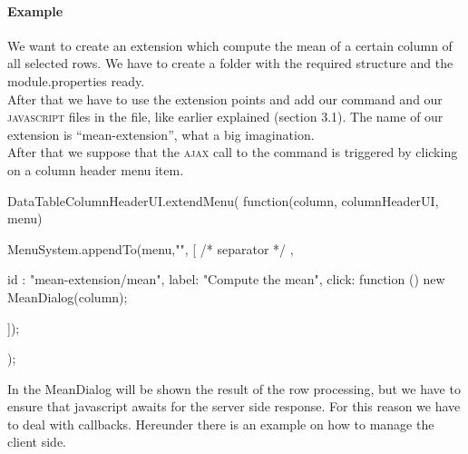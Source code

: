 \paragraph{Example}  We want to create an extension which compute the mean of a certain column of all selected rows. We have to create a folder with the required structure and the module.properties ready. \\
After that we have to use the extension points and add our command and our \textsc{javascript} files in the  file, like earlier explained (section 3.1). The name of our extension is ``mean-extension'', what a big imagination. \\
After that we suppose that the \textsc{ajax} call to the command is triggered by clicking on a column header menu item.
\begin{code}
DataTableColumnHeaderUI.extendMenu(
   function(column, columnHeaderUI, menu){	
      MenuSystem.appendTo(menu,"", 
      [ { /* separator */ }, {
         id : "mean-extension/mean",
         label: "Compute the mean",
         click:  function () { 
             new MeanDialog(column); 
         }

      } ]);
});
\end{code}
In the MeanDialog will be shown the result of the row processing, but we have to ensure that javascript awaits for the server side response. For this reason we have to deal with callbacks. Hereunder there is an example on how to manage the client side.
